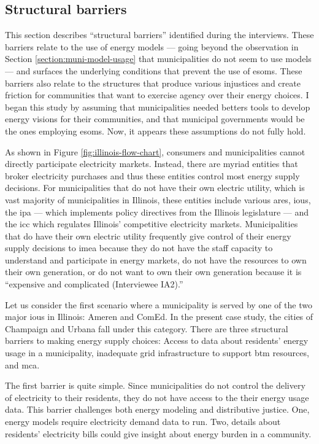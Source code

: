 \subsection{Structural barriers}
\label{section:structural-barriers}

This section describes ``structural barriers'' identified during the interviews.
These barriers relate to the use of energy models --- going beyond the
observation in Section \ref{section:muni-model-usage} that municipalities do not
seem to use models --- and surfaces the underlying conditions that prevent the
use of \acp{esom}. These barriers also relate to the structures that produce
various injustices and create friction for communities that want to exercise
agency over their energy choices. I began this study by assuming that
municipalities needed betters tools to develop energy visions for their
communities, and that municipal governments would be the ones employing
\acp{esom}. Now, it appears these assumptions do not fully hold.

As shown in Figure \ref{fig:illinois-flow-chart}, consumers and municipalities
cannot directly participate electricity markets. Instead, there are myriad
entities that broker electricity purchases and thus these entities control most
energy supply decisions. For municipalities that do not have their own electric
utility, which is vast majority of municipalities in Illinois, these entities
include various \ac{ares}, \acp{iou}, the \ac{ipa} --- which implements policy
directives from the Illinois legislature --- and the \ac{icc} which regulates
Illinois' competitive electricity markets. Municipalities that do have their own
electric utility frequently give control of their energy supply decisions to
\ac{imea} because they do not have the staff capacity to understand and
participate in energy markets, do not have the resources to own their own
generation, or do not want to own their own generation because it is ``expensive
and complicated (Interviewee IA2).''

Let us consider the first scenario where a municipality is served by one of the
two major \acp{iou} in Illinois: Ameren and ComEd. In the present case study,
the cities of Champaign and Urbana fall under this category. There are three
structural barriers to making energy supply choices: Access to data about
residents' energy usage in a municipality, inadequate grid infrastructure to
support \ac{btm} resources, and \acf{mca}.

The first barrier is quite simple. Since municipalities do not control the
delivery of electricity to their residents, they do not have access to the their
energy usage data. This barrier challenges both energy modeling and distributive
justice. One, energy models require electricity demand data to run. Two, details
about residents' electricity bills could give insight about energy burden in a
community.

